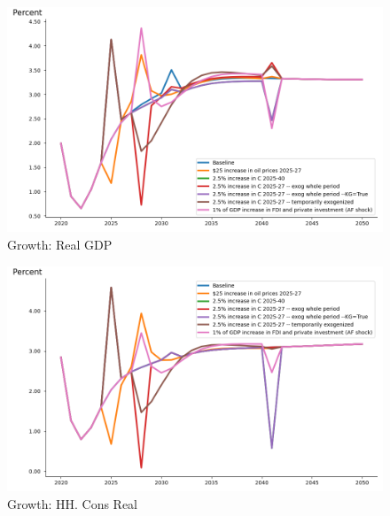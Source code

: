 \documentclass{article}
\begin{document}
 
\begin{figure}[htbp]
\centering
\includegraphics[width=\textwidth]{"../A_plot/Real GDP, growth.png"}
\caption{Growth: Real GDP}
\end{figure} 
 
\begin{figure}[htbp]
\centering
\includegraphics[width=\textwidth]{"../A_plot/HH. Cons Real, growth.png"}
\caption{Growth: HH. Cons Real}
\end{figure} 
\end{document}
